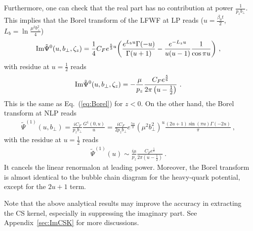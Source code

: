 \documentclass[a4paper,11pt]{article}
\begin{document}
Furthermore, one can check that the real part has no contribution at power $\frac{1}{p_zb_\perp}$.  This implies that the Borel transform of the LFWF at LP reads ($u=\frac{\beta_0 t}{2}$, $L_b=\ln \frac{\mu^2b_\perp^2}{4}$)
\begin{align}
{\rm Im }\tilde \Psi^{0}(u,b_\perp,\zeta_z)= \frac{1}{4}C_Fe^{\frac{5}{3}u}\bigg(\frac{ e^{L_bu} \Gamma (-u)}{\Gamma (u+1)}-\frac{e^{-L_zu} }{u(u-1)}\frac{1}{\cos \pi u}\bigg) \ ,
\end{align}
with residue at $u=\frac{1}{2}$ reads
\begin{align}
{\rm Im }\tilde \Psi^{0}(u,b_\perp,\zeta_z)=-\frac{\mu}{p_z}\frac{C_Fe^{\frac{5}{6}}}{2\pi \left(u-\frac{1}{2}\right)} \ .
\end{align}
This is the same as Eq.~(\ref{eq:Borel}) for $z<0$. On the other hand, the Borel transform at NLP reads 
\begin{align}\label{eq:NLPresults}
{\tilde \Psi}^{(1)}(u,b_\perp)=\frac{iC_F}{p_zb_\perp}\frac{G^1\left(0,u\right)}{u}=\frac{iC_F}{2p_zb_\perp}e^{\frac{5u}{3}}(\mu^2b_\perp^2)^u \frac{(2u+1) \sin (\pi  u) \Gamma (-2 u)}{\pi } \ ,
\end{align}
with the residue at $u=\frac{1}{2}$ reads
\begin{align}\label{eq:NLPresidue}
{ \tilde \Psi}^{(1)}(u)\sim \frac{i\mu}{p_z}\frac{C_Fe^{\frac{5}{6}}}{2\pi \left(u-\frac{1}{2}\right)} \ .
\end{align}
It cancels the linear renormalon at leading power. Moreover, the Borel transform is almost identical to the bubble chain diagram for the heavy-quark potential, except for the $2u+1$ term. 

Note that the above analytical results may improve the accuracy in extracting the CS kernel, especially in suppressing the imaginary part. See Appendix~\ref{sec:ImCSK} for more discussions. 
\end{document}
